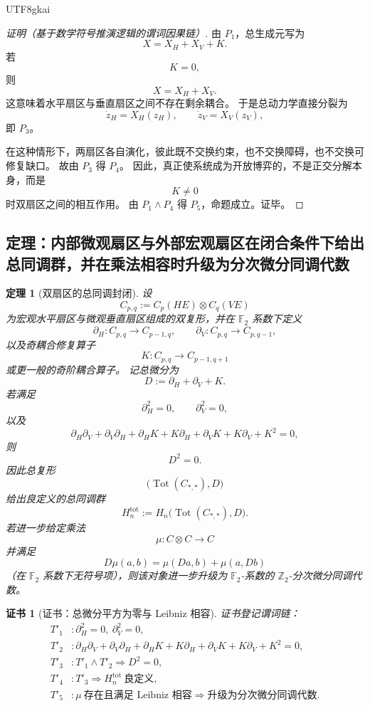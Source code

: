 \documentclass[12pt]{article}
\newtheorem{theorem}{定理}[section]
\newtheorem{Certificate}{证书}[section]
\newcommand{\Ztwo}{\mathbb{Z}_2}
\newcommand{\Ftwo}{\mathbb{F}_2}
\newcommand{\Tot}{\operatorname{Tot}}
\begin{document}
\begin{CJK*}{UTF8}{gkai}
\begin{proof}[证明（基于数学符号推演逻辑的谓词因果链）]
由 $P_1$，总生成元写为
\[
  X=X_H+X_V+K.
\]
若
\[
  K=0,
\]
则
\[
  X=X_H+X_V.
\]
这意味着水平扇区与垂直扇区之间不存在剩余耦合。
于是总动力学直接分裂为
\[
  \dot z_H=X_H(z_H),
  \qquad
  \dot z_V=X_V(z_V),
\]
即 $P_3$。

在这种情形下，两扇区各自演化，彼此既不交换约束，也不交换障碍，也不交换可修复缺口。
故由 $P_3$ 得 $P_4$。
因此，真正使系统成为开放博弈的，不是正交分解本身，而是
\[
  K\neq 0
\]
时双扇区之间的相互作用。
由 $P_1\wedge P_4$ 得 $P_5$，命题成立。证毕。
\end{proof}

\subsection{定理：内部微观扇区与外部宏观扇区在闭合条件下给出总同调群，并在乘法相容时升级为分次微分同调代数}
\label{subsec:tex43-ch2-theorem-total}

\begin{theorem}[双扇区的总同调封闭]
\label{thm:tex43-macro-micro-total}
设
\[
  C_{p,q}:=C_p(HE)\otimes C_q(VE)
\]
为宏观水平扇区与微观垂直扇区组成的双复形，并在 \(\Ftwo\) 系数下定义
\[
  \partial_H:C_{p,q}\to C_{p-1,q},
  \qquad
  \partial_V:C_{p,q}\to C_{p,q-1},
\]
以及奇耦合修复算子
\[
  K:C_{p,q}\to C_{p-1,q+1}
\]
或更一般的奇阶耦合算子。
记总微分为
\[
  D:=\partial_H+\partial_V+K.
\]
若满足
\[
  \partial_H^2=0,
  \qquad
  \partial_V^2=0,
\]
以及
\[
  \partial_H\partial_V+\partial_V\partial_H
  +
  \partial_HK+K\partial_H
  +
  \partial_VK+K\partial_V
  +
  K^2
  =0,
\]
则
\[
  D^2=0.
\]
因此总复形
\[
  \bigl(\Tot(C_{*,*}),D\bigr)
\]
给出良定义的总同调群
\[
  H_n^{\mathrm{tot}}:=H_n\bigl(\Tot(C_{*,*}),D\bigr).
\]
若进一步给定乘法
\[
  \mu:C\otimes C\to C
\]
并满足
\[
  D\mu(a,b)=\mu(Da,b)+\mu(a,Db)
\]
（在 \(\Ftwo\) 系数下无符号项），则该对象进一步升级为 \(\Ftwo\)-系数的 \(\Ztwo\)-分次微分同调代数。
\end{theorem}

\begin{Certificate}[证书：总微分平方为零与 Leibniz 相容]
\label{cert:tex43-macro-micro-total}
证书登记谓词链：
\[
\begin{aligned}
  T'_1 &: \partial_H^2=0,\ \partial_V^2=0,\\
  T'_2 &: \partial_H\partial_V+\partial_V\partial_H+\partial_HK+K\partial_H+\partial_VK+K\partial_V+K^2=0,\\
  T'_3 &: T'_1\wedge T'_2 \Rightarrow D^2=0,\\
  T'_4 &: T'_3 \Rightarrow H_n^{\mathrm{tot}}\ \text{良定义},\\
  T'_5 &: \mu\ \text{存在且满足 Leibniz 相容} \Rightarrow \text{升级为分次微分同调代数}.
\end{aligned}
\]
\end{Certificate}


\end{CJK*}
\end{document}
